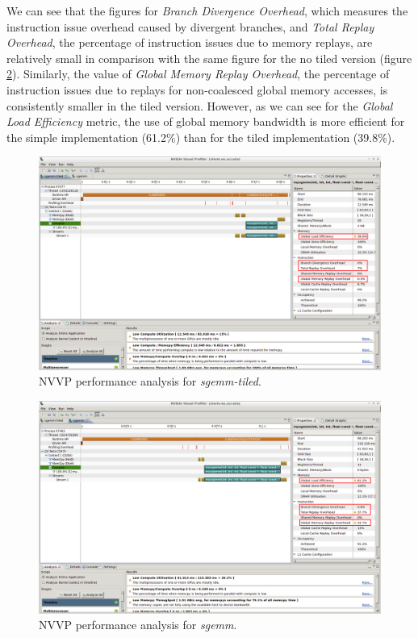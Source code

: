 \documentclass[a4paper,10pt]{scrartcl}
\begin{document}
\begin{enumerate}
We can see that the figures for \textit{Branch Divergence Overhead}, which measures the instruction issue overhead caused by divergent branches, and \textit{Total Replay Overhead}, the percentage of instruction issues due to memory replays, are relatively small in comparison with the same figure for the no tiled version (figure \ref{fig:profile_sgemm}).  Similarly, the value of \textit{Global Memory Replay Overhead}, the percentage of instruction issues due to replays for non-coalesced global memory accesses, is consistently smaller in the tiled version. However, as we can see for the \textit{Global Load Efficiency } metric, the use of global memory bandwidth is more efficient for the simple implementation (61.2\%) than for the tiled implementation (39.8\%).

 \begin{figure}
 \centering
 \includegraphics[width=\textwidth]{./profile_sgemm-tiled.png}
 \caption{NVVP performance analysis for \textit{sgemm-tiled}.}\label{fig:profile_sgemm-tiled}
 \end{figure}

 \begin{figure}
 \centering
 \includegraphics[width=\textwidth]{./profile_sgemm.png}
 \caption{NVVP performance analysis for \textit{sgemm}.}\label{fig:profile_sgemm}
 \end{figure}
 

\end{enumerate}
\end{document}
